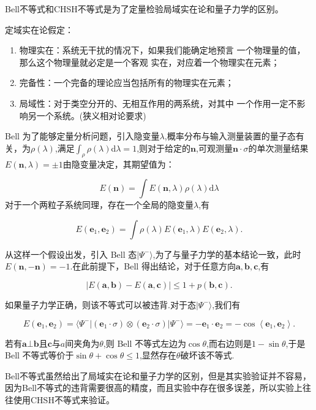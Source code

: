 \documentclass[a4paper,UTF8]{ctexart}
\begin{document}
Bell不等式和CHSH不等式是为了定量检验局域实在论和量子力学的区别。

定域实在论假定：

\begin{enumerate}
    \item 物理实在：系统无干扰的情况下，如果我们能确定地预言
一个物理量的值，那么这个物理量就必定是一个客观
实在，对应着一个物理实在元素；
    \item 完备性：一个完备的理论应当包括所有的物理实在元素；
    \item 局域性：对于类空分开的、无相互作用的两系统，对其中
一个作用一定不影响另一个系统。(狭义相对论要求)
\end{enumerate}

Bell 为了能够定量分析问题，引入隐变量$\lambda$,概率分布与输入测量装置的量子态有关，为$\rho(\lambda)$,满足$\int _{\rho}\rho\left ( \lambda\right ) $d$\lambda= 1$,则对于给定的$\boldsymbol{n}$,可观测量$\boldsymbol{n}\cdot\sigma$的单次测量结果$E(\boldsymbol{n},\lambda)=\pm1$由隐变量决定，其期望值为：

$$
E(\boldsymbol{n})=\int E\left(\boldsymbol{n},\lambda\right)\rho(\lambda)\mathrm{d}\lambda 
$$
 对于一个两粒子系统同理，存在一个全局的隐变量$\lambda$,有

$$
E(\boldsymbol{e}_1,\boldsymbol{e}_2)=\int\rho(\lambda)E(\boldsymbol{e}_1,\lambda)E(\boldsymbol{e}_2,\lambda).
$$

从这样一个假设出发，引入 Bell 态$|\Psi^-\rangle$,为了与量子力学的基本结论一致，此时$E(\boldsymbol{n},-\boldsymbol{n})=-1$.在此前提下，Bell 得出结论，对于任意方向$\boldsymbol{a},\boldsymbol{b},\boldsymbol{c}$,有

$$
|E(\boldsymbol{a},\boldsymbol{b})-E(\boldsymbol{a},\boldsymbol{c})|\leq1+p(\boldsymbol{b},\boldsymbol{c}).
$$

如果量子力学正确，则该不等式可以被违背.对于态$|\Psi^-\rangle$,我们有

$$
E(\boldsymbol{e}_1,\boldsymbol{e}_2)=\langle\Psi^-|\left(\boldsymbol{e}_1\cdot\sigma\right)\otimes(\boldsymbol{e}_2\cdot\sigma)|\Psi^-\rangle=-\boldsymbol{e}_1\cdot\boldsymbol{e}_2=-\cos\left\langle\boldsymbol{e}_1,\boldsymbol{e}_2\right\rangle.
$$

若有$\boldsymbol{a}\bot\boldsymbol{b}$且$\boldsymbol{c}$与$a$间夹角为$\theta$,则 Bell 不等式左边为$\cos\theta$,而右边则是$1-\sin\theta$,于是Bell 不等式等价于$\sin\theta+\cos\theta\leq1$,显然存在$\theta$破坏该不等式.

Bell不等式虽然给出了局域实在论和量子力学的区别，但是其实验验证并不容易，因为Bell不等式的违背需要很高的精度，而且实验中存在很多误差，所以实验上往往使用CHSH不等式来验证。
\end{document}
